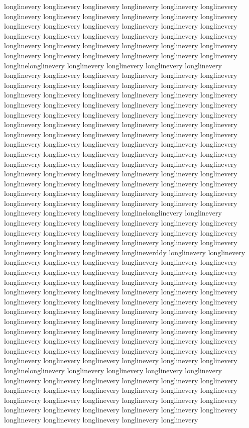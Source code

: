 {longlinevery longlinevery longlinevery longlinevery longlinevery longlinevery longlinevery longlinevery longlinevery longlinevery longlinevery longlinevery longlinevery longlinevery longlinevery longlinevery longlinevery longlinevery longlinevery longlinevery longlinevery longlinevery longlinevery longlinevery longlinevery longlinevery longlinevery longlinevery longlinevery longlinevery longlinevery longlinevery longlinevery longlinevery longlinevery longlinevery longlinelonglinevery longlinevery longlinevery longlinevery longlinevery longlinevery longlinevery longlinevery longlinevery longlinevery longlinevery longlinevery longlinevery longlinevery longlinevery longlinevery longlinevery longlinevery longlinevery longlinevery longlinevery longlinevery longlinevery longlinevery longlinevery longlinevery longlinevery longlinevery longlinevery longlinevery longlinevery longlinevery longlinevery longlinevery longlinevery longlinevery longlinevery longlinevery longlinevery longlinevery longlinevery longlinevery longlinevery longlinevery longlinevery longlinevery longlinevery longlinevery longlinevery longlinevery longlinevery longlinevery longlinevery longlinevery longlinevery longlinevery longlinevery longlinevery longlinevery longlinevery longlinevery longlinevery longlinevery longlinevery longlinevery longlinevery longlinevery longlinevery longlinevery longlinevery longlinevery longlinevery longlinevery longlinevery longlinevery longlinevery longlinevery longlinevery longlinevery longlinevery longlinevery longlinevery longlinevery longlinevery longlinevery longlinevery longlinevery longlinevery longlinevery longlinevery longlinevery longlinevery longlinelonglinevery longlinevery longlinevery longlinevery longlinevery longlinevery longlinevery longlinevery longlinevery longlinevery longlinevery longlinevery longlinevery longlinevery longlinevery longlinevery longlinevery longlinevery longlinevery longlinevery longlinevery longlinevery longlinevery longlineverddy longlinevery longlinevery longlinevery longlinevery longlinevery longlinevery longlinevery longlinevery longlinevery longlinevery longlinevery longlinevery longlinevery longlinevery longlinevery longlinevery longlinevery longlinevery longlinevery longlinevery longlinevery longlinevery longlinevery longlinevery longlinevery longlinevery longlinevery longlinevery longlinevery longlinevery longlinevery longlinevery longlinevery longlinevery longlinevery longlinevery longlinevery longlinevery longlinevery longlinevery longlinevery longlinevery longlinevery longlinevery longlinevery longlinevery longlinevery longlinevery longlinevery longlinevery longlinevery longlinevery longlinevery longlinevery longlinevery longlinevery longlinevery longlinevery longlinevery longlinevery longlinevery longlinevery longlinevery longlinevery longlinevery longlinevery longlinevery longlinevery longlinelonglinevery longlinevery longlinevery longlinevery longlinevery longlinevery longlinevery longlinevery longlinevery longlinevery longlinevery longlinevery longlinevery longlinevery longlinevery longlinevery longlinevery longlinevery longlinevery longlinevery longlinevery longlinevery longlinevery longlinevery longlinevery longlinevery longlinevery longlinevery longlinevery longlinevery longlinevery longlinevery longlinevery longlinevery }
